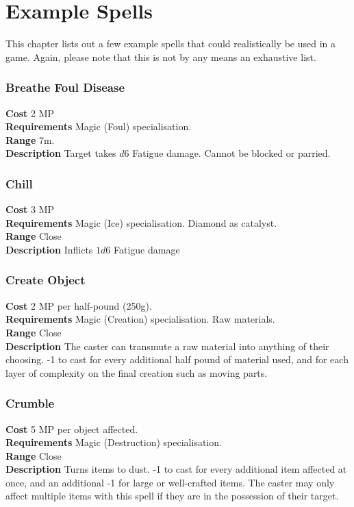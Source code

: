 \chapter{Example Spells}
This chapter lists out a few example spells that could realistically be used in a game.
Again, please note that this is not by any means an exhaustive list.

\subsection{Breathe Foul Disease}
\textbf{Cost} 2 MP\\
\textbf{Requirements} Magic (Foul) specialisation. \\
\textbf{Range} 7m. \\
\textbf{Description} Target takes $d6$ Fatigue damage. 
Cannot be blocked or parried.

\subsection{Chill}
\textbf{Cost} 3 MP\\
\textbf{Requirements} Magic (Ice) specialisation. 
Diamond as catalyst. \\
\textbf{Range} Close\\
\textbf{Description} Inflicts $1d6$ Fatigue damage

\subsection{Create Object}
\textbf{Cost} 2 MP per half-pound (250g).\\
\textbf{Requirements} Magic (Creation) specialisation. Raw materials.\\
\textbf{Range} Close\\
\textbf{Description} The caster can transmute a raw material into anything of their choosing. 
-1 to cast for every additional half pound of material used, and for each layer of complexity on the final creation such as moving parts.

\subsection{Crumble}
\textbf{Cost} 5 MP per object affected.\\
\textbf{Requirements} Magic (Destruction) specialisation.\\
\textbf{Range} Close\\
\textbf{Description} Turns items to dust. 
-1 to cast for every additional item affected at once, and an additional -1 for large or well-crafted items.
The caster may only affect multiple items with this spell if they are in the possession of their target.

